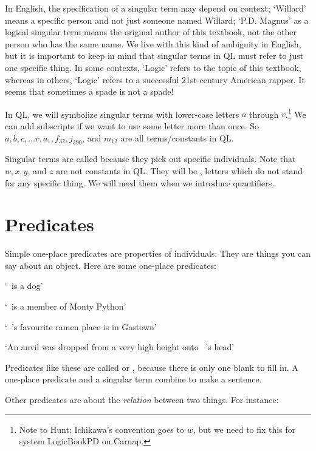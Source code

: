 In English, the specification of a singular term may depend on context; `Willard' means a specific person and not just someone named Willard; `P.D. Magnus' as a logical singular term means the original author of this textbook, not the other person who has the same name. We live with this kind of ambiguity in English, but it is important to keep in mind that singular terms in QL must refer to just one specific thing. {\color{black}In some contexts, `Logic' refers to the topic of this textbook, whereas in others, `Logic' refers to a successful 21st-century American rapper. It seems that sometimes a spade is not a spade!}

In QL, we will symbolize singular terms with lower-case letters $a$ through $v$.\footnote{Note to Hunt: Ichikawa's convention  goes to $w$, but we need to fix this for system LogicBookPD on Carnap.} We can add subscripts if we want to use some letter more than once. So $a,b,c,\ldots v, a_1, f_{32}, j_{390}$, and $m_{12}$ are all terms/constants in QL.

Singular terms are called  because they pick out specific individuals. Note that $w, x, y$, and $z$ are not constants in QL. They will be , letters which do not stand for any specific thing. We will need them when we introduce quantifiers.

\section{Predicates}
Simple one-place predicates are properties of individuals. They are things you can say about an object. Here are some one-place predicates:

\begin{earg}
\item[] `\blank\ is a dog'
\item[] `\blank\ is a member of Monty Python'
\item[] `\blank\ 's favourite ramen place is in Gastown'
\item[] `An anvil was dropped from a very high height onto \blank\ 's head'
\end{earg}

Predicates like these are called  or , because there is only one blank to fill in. A one-place predicate and a singular term combine to make a sentence.

Other predicates are about the \emph{relation} between two things. For instance:

